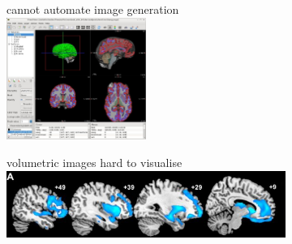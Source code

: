 \documentclass[10pt,xcolor=table,aspectratio=169]{beamer}
\begin{document}
\begin{frame}[t]
\begin{figure}
\begin{subfigure}[t]{0.3\textwidth}
\end{subfigure}
\begin{subfigure}[t]{0.3\textwidth}
\centering
 \begin{minipage}[t][3.5cm][t]{\textwidth}
 \centering
\myno cannot automate image generation\\
\includegraphics[width=0.5\textwidth]{images/freeviewInterface.jpg}
 \end{minipage}


% 



\end{subfigure}
\begin{subfigure}[t]{0.3\textwidth}
\centering
 \begin{minipage}[t][3.5cm][t]{\textwidth}
 \centering
\myno volumetric images hard to visualise\\
\vspace{1.5em}
\includegraphics[width=\textwidth]{images/seeleyImages} 
\vspace{1.0em}
 \end{minipage}




\end{subfigure}

\end{figure}
 
\end{frame}
\end{document}
